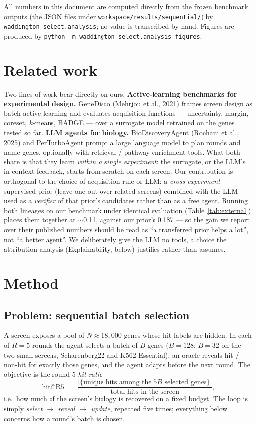 \documentclass[11pt]{article}
\begin{document}
\noindent
All numbers in this document are computed directly from the frozen benchmark outputs
(the JSON files under \texttt{workspace/results/sequential/}) by
\texttt{waddington\_select.analysis}; no value is transcribed by hand.
Figures are produced by \texttt{python -m waddington\_select.analysis figures}.

\section*{Related work}

Two lines of work bear directly on ours. \textbf{Active-learning benchmarks for experimental design.}
GeneDisco (Mehrjou et al., 2021) frames screen design as batch active learning and evaluates acquisition
functions --- uncertainty, margin, coreset, $k$-means, BADGE --- over a surrogate model retrained on the
genes tested so far. \textbf{LLM agents for biology.} BioDiscoveryAgent (Roohani et al., 2025) and
PerTurboAgent prompt a large language model to plan rounds and name genes, optionally with
retrieval / pathway-enrichment tools. What both share is that they learn \emph{within a single
experiment}: the surrogate, or the LLM's in-context feedback, starts from scratch on each screen. Our
contribution is orthogonal to the choice of acquisition rule or LLM: a \emph{cross-experiment}
supervised prior (leave-one-out over related screens) combined with the LLM used as a \emph{verifier} of
that prior's candidates rather than as a free agent. Running both lineages on our benchmark under
identical evaluation (Table~\ref{tab:external}) places them together at $\sim$0.11, against our prior's
0.187 --- so the gain we report over their published numbers should be read as ``a transferred prior
helps a lot'', not ``a better agent''. We deliberately give the LLM no tools, a choice the attribution
analysis (Explainability, below) justifies rather than assumes.

\section*{Method}

\subsection*{Problem: sequential batch selection}

A screen exposes a pool of $N \approx 18{,}000$ genes whose hit labels are hidden. In each of $R = 5$
rounds the agent selects a batch of $B$ genes ($B = 128$; $B = 32$ on the two small screens,
Scharenberg22 and K562-Essential), an oracle reveals hit / non-hit for exactly those genes, and the
agent adapts before the next round. The objective is the round-5 \emph{hit ratio}
\[
  \mathrm{hit@R5} \;=\; \frac{\lvert \{\text{unique hits among the }5B\text{ selected genes}\}\rvert}{\text{total hits in the screen}},
\]
i.e.\ how much of the screen's biology is recovered on a fixed budget. The loop is simply
\emph{select $\rightarrow$ reveal $\rightarrow$ update}, repeated five times; everything below concerns
how a round's batch is chosen.
\end{document}
